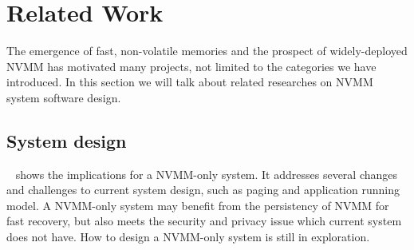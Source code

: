 \section{Related Work} 
\label{sec:related}

\begin{table}[hbtp]
	\vspace*{1mm}
	\caption{}
	\label{table:comparison}
\end{table}

The emergence of fast, non-volatile memories and the prospect of
widely-deployed NVMM has motivated many projects, not limited to the categories
we have introduced. In this section we will talk about related researches
on NVMM system software design.

\subsection{System design} 
\label{sec:systemdesign}

~\cite{systemimplications} shows the implications for a NVMM-only
system. It addresses several changes and challenges to current system design,
such as paging and application running model. A NVMM-only system may benefit
from the persistency of NVMM for fast recovery, but also meets the security
and privacy issue which current system does not have. How to design a
NVMM-only system is still in exploration.

